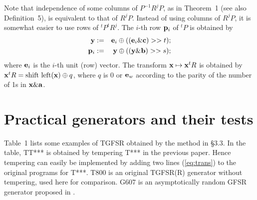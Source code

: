 Note that independence of some columns of 
$P^{-1}R^jP$,
as in Theorem~1 (see also Definition~5),
is equivalent to that
of $R^jP$.
Instead of using columns of $R^jP$,
it is somewhat easier to use rows
of $^tP^tR^j$. The $i$-th row ${\bf p}_i$
of $^tP$ is obtained by
\begin{eqnarray*}
  {\bf y} & := & {\bf e}_i \oplus (({\bf e}_i \& {\bf c}) >> t); \\
  {\bf p}_i & := & {\bf y} \oplus (({\bf y} \& {\bf b}) >> s);
\end{eqnarray*}
where ${\bf e}_i$ is the $i$-th unit (row) vector.
The transform 
${\bf x} \mapsto {\bf x}^tR$
is obtained by
${\bf x}^tR=\mbox{shift left}({\bf x}) \oplus q$,
where $q$ is 0 or ${\bf e}_w$ according to 
the parity of the number of 1s in ${\bf x} \& {\bf a}$.

\section{Practical generators and their tests}
Table~1 lists some examples of TGFSR obtained by the method
in \S3.3.
In the table, TT*** is obtained by tempering T*** in the
previous paper\cite{matsumoto}. Hence tempering
can easily be implemented by adding two lines (\ref{eq:trans}) 
to the original
programs for T***. T800 is an original TGFSR(R) generator without
tempering, used here for comparison.
G607 is an asymptotically random GFSR generator 
proposed in \cite{tootill}.

